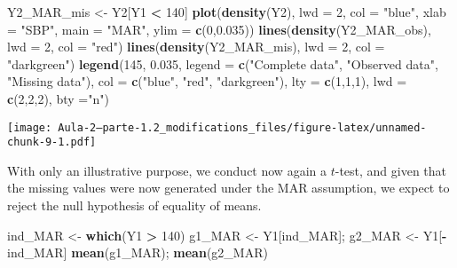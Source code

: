 \documentclass[
]{article}
\newenvironment{Shaded}{\begin{snugshade}}{\end{snugshade}}
\newcommand{\AttributeTok}[1]{\textcolor[rgb]{0.13,0.29,0.53}{#1}}
\newcommand{\DecValTok}[1]{\textcolor[rgb]{0.00,0.00,0.81}{#1}}
\newcommand{\FloatTok}[1]{\textcolor[rgb]{0.00,0.00,0.81}{#1}}
\newcommand{\FunctionTok}[1]{\textcolor[rgb]{0.13,0.29,0.53}{\textbf{#1}}}
\newcommand{\NormalTok}[1]{#1}
\newcommand{\OtherTok}[1]{\textcolor[rgb]{0.56,0.35,0.01}{#1}}
\newcommand{\SpecialCharTok}[1]{\textcolor[rgb]{0.81,0.36,0.00}{\textbf{#1}}}
\newcommand{\StringTok}[1]{\textcolor[rgb]{0.31,0.60,0.02}{#1}}
\begin{document}
\begin{Shaded}
\begin{Highlighting}[]
\NormalTok{Y2\_MAR\_mis }\OtherTok{\textless{}{-}}\NormalTok{ Y2[Y1 }\SpecialCharTok{\textless{}} \DecValTok{140}\NormalTok{] }
\FunctionTok{plot}\NormalTok{(}\FunctionTok{density}\NormalTok{(Y2), }\AttributeTok{lwd =} \DecValTok{2}\NormalTok{, }\AttributeTok{col =} \StringTok{"blue"}\NormalTok{, }\AttributeTok{xlab =} \StringTok{"SBP"}\NormalTok{, }\AttributeTok{main =} \StringTok{"MAR"}\NormalTok{, }\AttributeTok{ylim =} \FunctionTok{c}\NormalTok{(}\DecValTok{0}\NormalTok{,}\FloatTok{0.035}\NormalTok{))}
\FunctionTok{lines}\NormalTok{(}\FunctionTok{density}\NormalTok{(Y2\_MAR\_obs), }\AttributeTok{lwd =} \DecValTok{2}\NormalTok{, }\AttributeTok{col =} \StringTok{"red"}\NormalTok{)}
\FunctionTok{lines}\NormalTok{(}\FunctionTok{density}\NormalTok{(Y2\_MAR\_mis), }\AttributeTok{lwd =} \DecValTok{2}\NormalTok{, }\AttributeTok{col =} \StringTok{"darkgreen"}\NormalTok{)}
\FunctionTok{legend}\NormalTok{(}\DecValTok{145}\NormalTok{, }\FloatTok{0.035}\NormalTok{, }\AttributeTok{legend =} \FunctionTok{c}\NormalTok{(}\StringTok{"Complete data"}\NormalTok{, }\StringTok{"Observed data"}\NormalTok{, }\StringTok{"Missing data"}\NormalTok{), }
       \AttributeTok{col =} \FunctionTok{c}\NormalTok{(}\StringTok{"blue"}\NormalTok{, }\StringTok{"red"}\NormalTok{, }\StringTok{"darkgreen"}\NormalTok{), }\AttributeTok{lty =} \FunctionTok{c}\NormalTok{(}\DecValTok{1}\NormalTok{,}\DecValTok{1}\NormalTok{,}\DecValTok{1}\NormalTok{), }\AttributeTok{lwd =} \FunctionTok{c}\NormalTok{(}\DecValTok{2}\NormalTok{,}\DecValTok{2}\NormalTok{,}\DecValTok{2}\NormalTok{), }\AttributeTok{bty =}\StringTok{"n"}\NormalTok{)}
\end{Highlighting}
\end{Shaded}

\texttt{[image: Aula-2---parte-1.2\_modifications\_files/figure-latex/unnamed-chunk-9-1.pdf]}

With only an illustrative purpose, we conduct now again a \(t\)-test,
and given that the missing values were now generated under the MAR
assumption, we expect to reject the null hypothesis of equality of
means.

\begin{Shaded}
\begin{Highlighting}[]
\NormalTok{ind\_MAR }\OtherTok{\textless{}{-}} \FunctionTok{which}\NormalTok{(Y1 }\SpecialCharTok{\textgreater{}} \DecValTok{140}\NormalTok{)}
\NormalTok{g1\_MAR }\OtherTok{\textless{}{-}}\NormalTok{ Y1[ind\_MAR]; g2\_MAR }\OtherTok{\textless{}{-}}\NormalTok{ Y1[}\SpecialCharTok{{-}}\NormalTok{ind\_MAR]}
\FunctionTok{mean}\NormalTok{(g1\_MAR); }\FunctionTok{mean}\NormalTok{(g2\_MAR)}
\end{Highlighting}
\end{Shaded}
\end{document}
